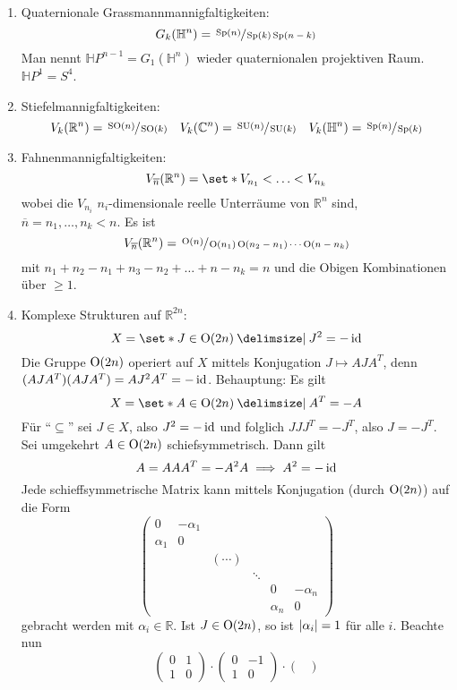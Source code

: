 \begin{beispiel*}
\begin{enumerate}[1)]
		\item Quaternionale Grassmannmannigfaltigkeiten:
		\[
			G_k(\mathbb{H}^n) = \sfrac{\Sp(n)}{\Sp(k) \Sp(n-k)}
		\]
		Man nennt $\mathbb{H}P^{n-1} = G_1(\mathbb{H}^n)$ wieder quaternionalen projektiven Raum. $\mathbb{H}P^1 = S^4$.
		\item Stiefelmannigfaltigkeiten:
		\[
			V_k(\mathbb{R}^n) = \sfrac{\SO(n)}{\SO(k)} \quad V_k(\mathbb{C}^n) = \sfrac{\SU(n)}{\SU(k)} \quad V_k(\mathbb{H}^n) = \sfrac{\Sp(n)}{\Sp(k)}
		\]
		\item Fahnenmannigfaltigkeiten:
		\[
			V_{\overline{n}}(\mathbb{R}^n) = \set*{V_{n_1} < \ldots < V_{n_k}}
		\]
		wobei die $V_{n_i}$ $n_i$-dimensionale reelle Unterräume von $\mathbb{R}^n$ sind, $\overline{n} = n_1, \ldots ,n_k <n$.
		Es ist
		\[
			V_{\overline{n}}(\mathbb{R}^n) = \sfrac{\On(n)}{\On(n_1) \On(n_2 - n_1) \cdots \On(n-n_k)}
		\]
		mit $n_1 + n_2 - n_1 + n_3 - n_2 + \ldots + n - n_k =n$ und die Obigen Kombinationen über $\ge 1$.
		\item Komplexe Strukturen auf $\mathbb{R}^{2n}$:
		\[
			X = \set*{J \in  \On(2n) \given J^2 = - \id}
		\]
		Die Gruppe $\On(2n)$ operiert auf $X$ mittels Konjugation $J \mapsto A J A^T$, denn $(AJA^T)(AJA^T) = A J^2 A^T = - \id$.
		Behauptung: Es gilt 
		\[
			X = \set*{A \in \On(2n) \given A^T = -A}
		\]
		Für \enquote{$\subseteq$} sei $J \in X$, also $J^2 = - \id$ und folglich $J J J^T = - J^T$, also $J= -J^T$.
		Sei umgekehrt $A \in \On(2n)$ schiefsymmetrisch.
		Dann gilt
		\[
			A = A A A^T = - A^2 A\implies A^2 = - \id
		\]
		Jede schieffsymmetrische Matrix kann mittels Konjugation (durch $\On(2n)$) auf die Form 
		\[
			\begin{pmatrix}
				0 & - \alpha_1 & & & & \\
				\alpha_1 & 0 & & & & \\
				& & (\cdots) & & &  \\
				& & & \ddots & & \\
				& & & & 0 & -\alpha_n \\
				& & & & \alpha_n & 0
			\end{pmatrix}
		\]
		gebracht werden mit $\alpha_i \in \mathbb{R}$.
		Ist $J \in \On(2n)$, so ist $\abs*{\alpha_i}=1 $ für alle $i$.
		Beachte nun
		\[
			\begin{pmatrix}
				0 & 1 \\ 1 & 0
			\end{pmatrix} \cdot \begin{pmatrix}
				0 & -1 \\ 1 & 0
			\end{pmatrix} \cdot \begin{pmatrix}

\end{pmatrix}\]
\end{enumerate}
\end{beispiel*}
